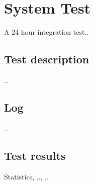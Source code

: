 \chapter{System Test}\label{chap:system_test_chapter}

A 24 hour integration test..




\section{Test description}
..

\section{Log}
..

\section{Test results}
Statistics, .., ..





